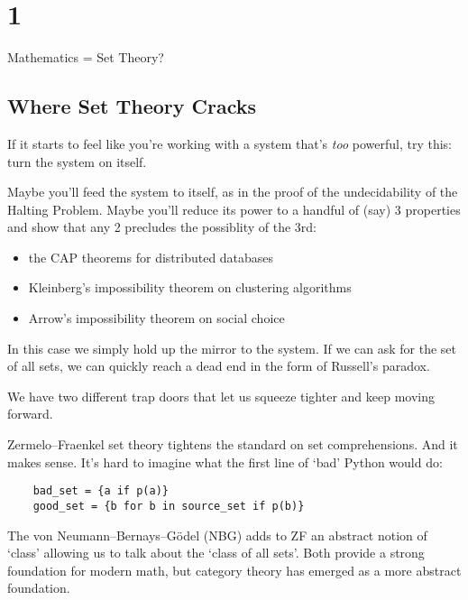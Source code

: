 \documentclass[12pt]{article}
\begin{document}
\chapter{1}{Mathematics = Set Theory?}

\section{Where Set Theory Cracks}

If it starts to feel like you're working with a system that's \emph{too} powerful, try this: turn the system on itself.

Maybe you'll feed the system to itself, as in the proof of the undecidability of the Halting Problem. 
Maybe you'll reduce its power to a handful of (say) 3 properties and show that any 2 precludes the possiblity of the 3rd:
\begin{itemize}
  \item the CAP theorems for distributed databases
  \item Kleinberg's impossibility theorem on clustering algorithms
  \item Arrow's impossibility theorem on social choice
\end{itemize}

In this case we simply hold up the mirror to the system. If we can ask for the set of all sets, we can quickly reach a dead end in the form of Russell's paradox.

We have two different trap doors that let us squeeze tighter and keep moving forward.

Zermelo–Fraenkel set theory tightens the standard on set comprehensions. And it makes sense. It's hard to imagine what the first line of `bad' Python would do:
\begin{verbatim}
    bad_set = {a if p(a)}
    good_set = {b for b in source_set if p(b)}
\end{verbatim}

The von Neumann–Bernays–Gödel (NBG) adds to ZF an abstract notion of `class' allowing us to talk about the `class of all sets'. 
Both provide a strong foundation for modern math, but category theory has emerged as a more abstract foundation.
\end{document}
